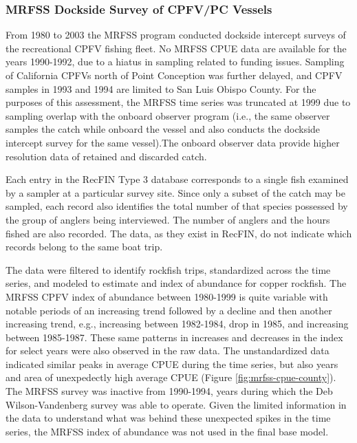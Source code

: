 \documentclass[11pt,
  letterpaper,
]{article}
\begin{document}
\subsubsection{MRFSS Dockside Survey of CPFV/PC Vessels}\label{mrfss-dockside-survey-of-cpfvpc-vessels}

From 1980 to 2003 the MRFSS program conducted dockside intercept surveys of the recreational CPFV fishing fleet. No MRFSS CPUE data are available for the years 1990-1992, due to a hiatus in sampling related to funding issues. Sampling of California CPFVs north of Point Conception was further delayed, and CPFV samples in 1993 and 1994 are limited to San Luis Obispo County. For the purposes of this assessment, the MRFSS time series was truncated at 1999 due to sampling overlap with the onboard observer program (i.e., the same observer samples the catch while onboard the vessel and also conducts the dockside intercept survey for the same vessel).The onboard observer data provide higher resolution data of retained and discarded catch.

Each entry in the RecFIN Type 3 database corresponds to a single fish examined by a sampler at a particular survey site. Since only a subset of the catch may be sampled, each record also identifies the total number of that species possessed by the group of anglers being interviewed. The number of anglers and the hours fished are also recorded. The data, as they exist in RecFIN, do not indicate which records belong to the same boat trip.

The data were filtered to identify rockfish trips, standardized across the time series, and modeled to estimate and index of abundance for copper rockfish. The MRFSS CPFV index of abundance between 1980-1999 is quite variable with notable periods of an increasing trend followed by a decline and then another increasing trend, e.g., increasing between 1982-1984, drop in 1985, and increasing between 1985-1987. These same patterns in increases and decreases in the index for select years were also observed in the raw data. The unstandardized data indicated similar peaks in average CPUE during the time series, but also years and area of unexpedectly high average CPUE (Figure \ref{fig:mrfss-cpue-county}). The MRFSS survey was inactive from 1990-1994, years during which the Deb Wilson-Vandenberg survey was able to operate. Given the limited information in the data to understand what was behind these unexpected spikes in the time series, the MRFSS index of abundance was not used in the final base model.
\end{document}
